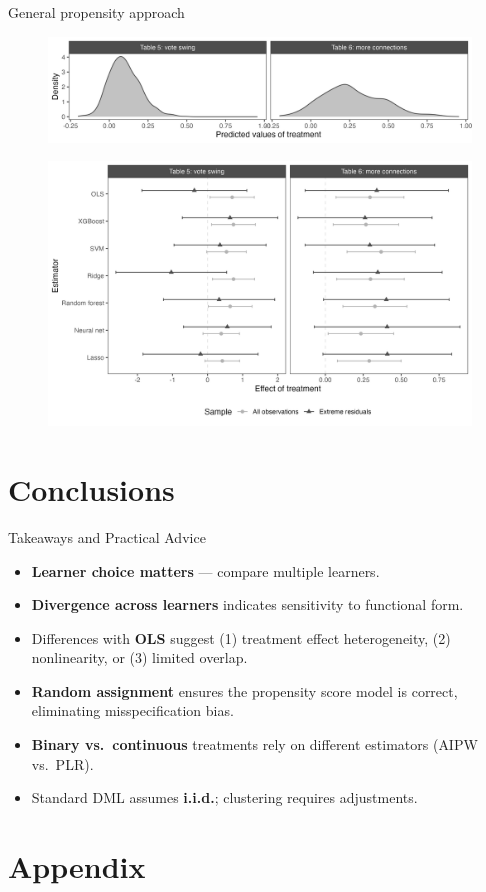 \documentclass[10pt,table,aspectratio=169]{beamer}
\begin{document}
\begin{frame}[plain, label = two_dimensions]{General propensity approach}

\begin{figure}[H]
 \includegraphics[width=0.7\linewidth]{figures/observational_density_predicted.png}
\end{figure}
\begin{figure}[H]
 \includegraphics[width=0.8\linewidth]{figures/observational_coefplot_predicted.png}
\end{figure}

\end{frame}


\section{Conclusions}

\begin{frame}[plain, label = two_dimensions]{Takeaways and Practical Advice}

\begin{itemize}
  \item \alert{\bf Learner choice matters} --- compare multiple learners.  \medskip \pause
  \item \alert{\bf Divergence across learners} indicates sensitivity to functional form.   \medskip \pause
  \item Differences with \alert{\bf OLS} suggest (1) \alert{treatment effect heterogeneity}, (2) \alert{nonlinearity}, or (3) \alert{limited overlap}.  \medskip \pause
  \item \alert{\bf Random assignment} ensures the propensity score model is correct, eliminating \alert{misspecification bias}. \medskip \pause
  \item \alert{\bf Binary vs.\ continuous} treatments rely on different estimators (\alert{AIPW} vs.\ \alert{PLR}).  \medskip \pause
  \item Standard DML assumes \alert{\bf i.i.d.}; clustering requires adjustments.  
 
\end{itemize}

\end{frame}



\section{Appendix}
\end{document}
